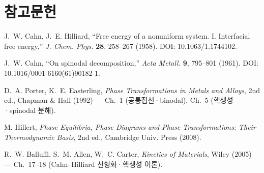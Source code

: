 \documentclass[11pt,a4paper]{article}
\begin{document}
\section*{참고문헌}
\begin{enumerate}[label={[A\arabic*]},leftmargin=3.2em]
\item J.~W. Cahn, J.~E. Hilliard, ``Free energy of a nonuniform system. I. Interfacial free energy,''
\textit{J. Chem. Phys.} \textbf{28}, 258--267 (1958). DOI: 10.1063/1.1744102.
\item J.~W. Cahn, ``On spinodal decomposition,'' \textit{Acta Metall.} \textbf{9}, 795--801 (1961).
DOI: 10.1016/0001-6160(61)90182-1.
\item D.~A. Porter, K.~E. Easterling, \textit{Phase Transformations in Metals and Alloys}, 2nd ed.,
Chapman \& Hall (1992) --- Ch.~1 (공통접선·binodal), Ch.~5 (핵생성·spinodal 분해).
\item M. Hillert, \textit{Phase Equilibria, Phase Diagrams and Phase Transformations: Their
Thermodynamic Basis}, 2nd ed., Cambridge Univ. Press (2008).
\item R.~W. Balluffi, S.~M. Allen, W.~C. Carter, \textit{Kinetics of Materials}, Wiley (2005) ---
Ch.~17--18 (Cahn--Hilliard 선형화·핵생성 이론).
\end{enumerate}
\end{document}
